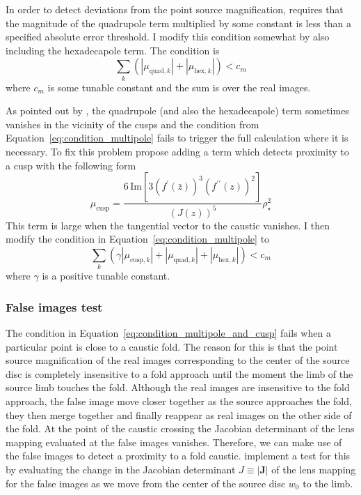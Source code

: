\documentclass[12pt,dvipsnames]{report}
\renewcommand{\vec}[1]{\boldsymbol{\mathbf{#1}}}
\begin{document}
In order to detect deviations from the point source magnification, 
\citet{2018MNRAS.479.5157B} requires that the magnitude of the quadrupole term multiplied 
by some constant is less than a specified absolute error threshold. I modify this condition
somewhat by also including the hexadecapole term. The condition is  
\begin{equation}
    \sum_k\left(|\mu_{\mathrm{quad},k}| + |\mu_{\mathrm{hex},k}| \right)<c_m
    \label{eq:condition_multipole}
\end{equation}
where $c_m$ is some tunable constant and the sum is over the real images.

As pointed out by \citet{2017MNRAS.468.3993C}, the quadrupole (and also the hexadecapole) 
term sometimes vanishes in the vicinity of the cusps and the condition from  
Equation~\ref{eq:condition_multipole} fails to trigger the full calculation where it is 
necessary. To fix this problem \citet{2017MNRAS.468.3993C} propose adding a term which
detects proximity to a cusp with the following form
\begin{equation}
\mu_\mathrm{cusp}=\frac{6\,\mathrm{Im}\left[3 (f^{\prime }(\bar{z}))^3 (f^{\prime \prime }(z))^2\right]}{(J(z))^5} \rho_\star^{2}
\end{equation}
This term is large when the tangential vector to the caustic vanishes.
I then modify the condition in Equation~\ref{eq:condition_multipole} to 
\begin{equation}
    \sum_k\left(\gamma|\mu_{\mathrm{cusp},k}| + |\mu_{\mathrm{quad},k}| + |\mu_{\mathrm{hex},k}| \right)<c_m
    \label{eq:condition_multipole_and_cusp}
\end{equation}
where $\gamma$ is a positive tunable constant.

\subsubsection{False images test}
The condition in Equation~\ref{eq:condition_multipole_and_cusp}
fails when a particular point is close to a caustic fold. 
The reason for this is that the point source magnification of the real images corresponding 
to the center of the source disc is completely insensitive to a fold approach until the 
moment the limb of the source limb touches the fold. Although the real images
are insensitive to the fold approach, the false image move closer together as the source 
approaches the fold, they then merge together and finally reappear as real images on the 
other side of the fold. At the point of the caustic crossing the Jacobian determinant of 
the lens mapping evaluated at the false images vanishes.
Therefore, we can make use of the false images to detect a proximity to a fold caustic. 
\citet{2018MNRAS.479.5157B} implement a test for this by evaluating the change in the 
Jacobian determinant $J\equiv|\vec J|$ of the lens mapping for the false images as
we move from the center of the source disc $w_0$ to the limb. 
\end{document}
